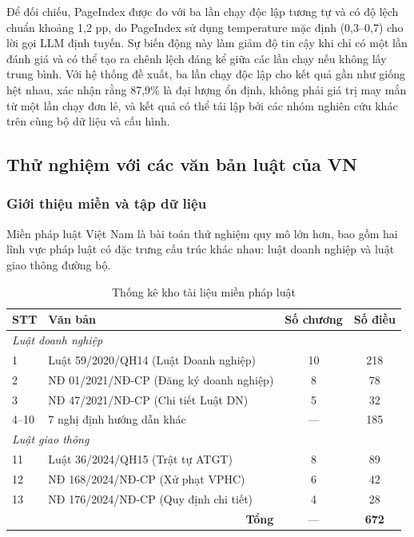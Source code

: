 Để đối chiếu, PageIndex được đo với ba lần chạy độc lập tương tự và có độ lệch chuẩn
khoảng 1,2 pp, do PageIndex sử dụng temperature mặc định (0,3--0,7) cho lời gọi LLM
định tuyến. Sự biến động này làm giảm độ tin cậy khi chỉ có một lần đánh giá và có thể
tạo ra chênh lệch đáng kể giữa các lần chạy nếu không lấy trung bình. Với hệ thống đề
xuất, ba lần chạy độc lập cho kết quả gần như giống hệt nhau, xác nhận rằng 87,9\% là
đại lượng ổn định, không phải giá trị may mắn từ một lần chạy đơn lẻ, và kết quả có thể
tái lập bởi các nhóm nghiên cứu khác trên cùng bộ dữ liệu và cấu hình.

\subsection{Thử nghiệm với các văn bản luật của VN}
\label{subsec:casestudy-phapluat}

\subsubsection*{Giới thiệu miền và tập dữ liệu}

Miền pháp luật Việt Nam là bài toán thử nghiệm quy mô lớn hơn, bao gồm hai lĩnh vực
pháp luật có đặc trưng cấu trúc khác nhau: luật doanh nghiệp và luật giao thông đường
bộ.

\begin{table}[htbp]
  \centering
  \caption{Thống kê kho tài liệu miền pháp luật}
  \label{tab:corpus-phapluat}
  \small
  \begin{tabular}{lp{5cm}cc}
    \toprule
    \textbf{STT} & \textbf{Văn bản} & \textbf{Số chương} & \textbf{Số điều} \\
    \midrule
    \multicolumn{4}{l}{\textit{Luật doanh nghiệp}} \\
    1 & Luật 59/2020/QH14 (Luật Doanh nghiệp) & 10 & 218 \\
    2 & NĐ 01/2021/NĐ-CP (Đăng ký doanh nghiệp) & 8 & 78 \\
    3 & NĐ 47/2021/NĐ-CP (Chi tiết Luật DN) & 5 & 32 \\
    4--10 & 7 nghị định hướng dẫn khác & --- & 185 \\
    \multicolumn{4}{l}{\textit{Luật giao thông}} \\
    11 & Luật 36/2024/QH15 (Trật tự ATGT) & 8 & 89 \\
    12 & NĐ 168/2024/NĐ-CP (Xử phạt VPHC) & 6 & 42 \\
    13 & NĐ 176/2024/NĐ-CP (Quy định chi tiết) & 4 & 28 \\
    \midrule
    \multicolumn{2}{r}{\textbf{Tổng}} & --- & \textbf{672} \\
    \bottomrule
  \end{tabular}
\end{table}


